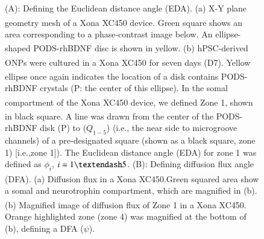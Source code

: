 \documentclass[review]{elsarticle}
\begin{document}
\begin{figure}
	\caption{(A): Defining the Euclidean distance angle (EDA). (a) X-Y plane geometry mesh of a Xona\textsuperscript{\texttrademark} XC450 device. Green square shows an area corresponding to a phase-contrast image below. An ellipse-shaped PODS\textsuperscript{\textregistered}-rhBDNF disc is shown in yellow. (b) hPSC-derived ONPs were cultured in a Xona\textsuperscript{\texttrademark} XC450 for seven days (D7). Yellow ellipse once again indicates the location of a disk contains PODS\textsuperscript{\textregistered}-rhBDNF crystals (P: the center of this ellipse). In the somal compartment of the Xona\textsuperscript{\texttrademark} XC450 device, we defined Zone 1, shown in black square. A line was drawn from the center of the PODS\textsuperscript{\textregistered}-rhBDNF disk (P) to ($Q_{1-5}$) (i.e., the near side to microgroove channels) of a pre-designated square (shown as a black square, zone 1) [i.e.,zone 1]). The Euclidean distance angle (EDA) for zone 1 was defined as $\phi_{i}$, $i = 1\textendash 5$. (B): Defining diffusion flux angle (DFA). (a) Diffusion flux in a Xona\textsuperscript{\texttrademark} XC450.Green squared area show a somal and neurotrophin compartment, which are magnified in (b). (b) Magnified image of diffusion flux of Zone 1 in a Xona\textsuperscript{\texttrademark} XC450. Orange highlighted zone (zone 4) was magnified at the bottom of (b), defining a DFA ($\psi$).}
\end{figure}
\end{document}
